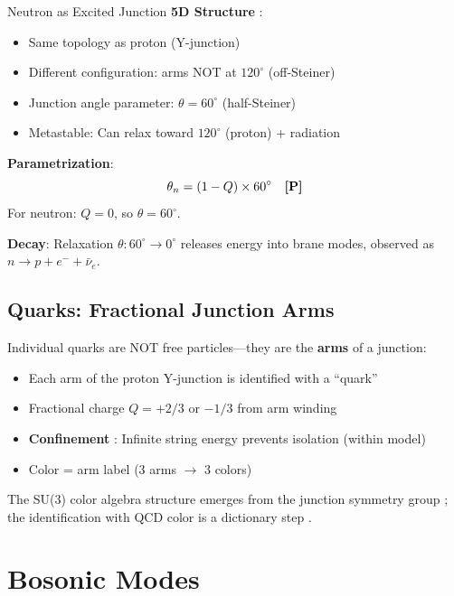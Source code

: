 \begin{mechanism}{Neutron as Excited Junction}
\textbf{5D Structure} \tagP{}:
\begin{itemize}[nosep]
\item Same topology as proton (Y-junction)
\item Different configuration: arms NOT at $120^\circ$ (off-Steiner)
\item Junction angle parameter: $\theta = 60^\circ$ (half-Steiner)
\item Metastable: Can relax toward $120^\circ$ (proton) + radiation
\end{itemize}

\textbf{Parametrization}:
\begin{equation}
\theta_n = (1 - Q) \times 60^\circ \quad \textbf{[P]}
\end{equation}
For neutron: $Q = 0$, so $\theta = 60^\circ$.

\textbf{Decay}: Relaxation $\theta: 60^\circ \to 0^\circ$ releases energy into brane modes,
observed as $n \to p + e^- + \bar{\nu}_e$.
\end{mechanism}

\subsection{Quarks: Fractional Junction Arms}

Individual quarks are NOT free particles---they are the \textbf{arms} of a junction:

\begin{itemize}[nosep]
\item Each arm of the proton Y-junction is identified with a ``quark'' \tagI{}
\item Fractional charge $Q = +2/3$ or $-1/3$ from arm winding \tagDer{}
\item \textbf{Confinement} \tagDer{}: Infinite string energy prevents isolation (within model)
\item Color = arm label (3 arms $\to$ 3 colors) \tagI{}
\end{itemize}

The SU(3) color algebra structure emerges from the junction symmetry group \tagDer{};
the identification with QCD color is a dictionary step \tagI{}.

\section{Bosonic Modes}
\label{sec:bosonic_modes}

